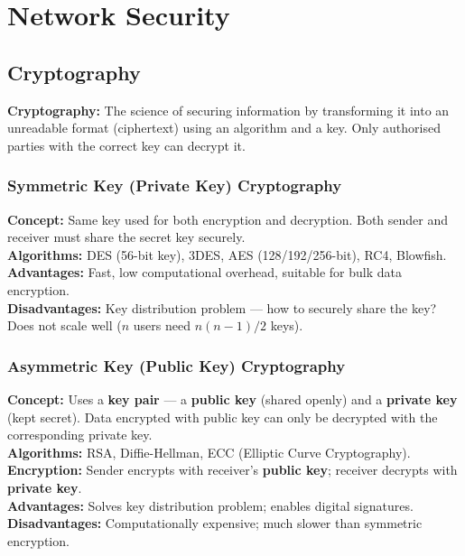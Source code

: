 \documentclass[12pt,a4paper]{article}
\begin{document}
\section{Network Security}

\subsection{Cryptography}

\begin{tcolorbox}[defbox]
\textbf{Cryptography:} The science of securing information by transforming it into an unreadable format (ciphertext) using an algorithm and a key. Only authorised parties with the correct key can decrypt it.
\end{tcolorbox}

\subsubsection*{Symmetric Key (Private Key) Cryptography}
\begin{tcolorbox}[formulabox, title={\textbf{Symmetric Key Cryptography}}]
\textbf{Concept:} Same key used for both encryption and decryption. Both sender and receiver must share the secret key securely.\\[4pt]
\textbf{Algorithms:} DES (56-bit key), 3DES, AES (128/192/256-bit), RC4, Blowfish.\\[4pt]
\textbf{Advantages:} Fast, low computational overhead, suitable for bulk data encryption.\\
\textbf{Disadvantages:} Key distribution problem --- how to securely share the key? Does not scale well ($n$ users need $n(n-1)/2$ keys).
\end{tcolorbox}

\subsubsection*{Asymmetric Key (Public Key) Cryptography}
\begin{tcolorbox}[formulabox, title={\textbf{Asymmetric Key Cryptography}}]
\textbf{Concept:} Uses a \textbf{key pair} --- a \textbf{public key} (shared openly) and a \textbf{private key} (kept secret). Data encrypted with public key can only be decrypted with the corresponding private key.\\[4pt]
\textbf{Algorithms:} RSA, Diffie-Hellman, ECC (Elliptic Curve Cryptography).\\[4pt]
\textbf{Encryption:} Sender encrypts with receiver's \textbf{public key}; receiver decrypts with \textbf{private key}.\\
\textbf{Advantages:} Solves key distribution problem; enables digital signatures.\\
\textbf{Disadvantages:} Computationally expensive; much slower than symmetric encryption.
\end{tcolorbox}
\end{document}
